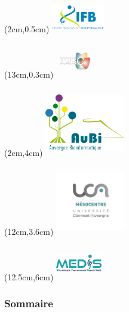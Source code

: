 
\begin{frame}
  \titlepage
  \begin{textblock*}{5cm}(2cm,0.5cm) %
  \includegraphics[width=2.3cm,height=1.3cm]{images/logo_ifb.pdf}
  \end{textblock*}
  \begin{textblock*}{5cm}(13cm,0.3cm) %
  \includegraphics[width=1.5cm,height=1.5cm]{images/i2bc.png}
  \end{textblock*}
  \begin{textblock*}{5cm}(2cm,4cm) %
  \includegraphics[width=3.5cm,height=3cm]{images/logoAuBi-2019.pdf}
  \end{textblock*}
  \begin{textblock*}{5cm}(12cm,3.6cm) %
  \includegraphics[width=3cm,height=3cm]{images/mesocentre.png}
  \end{textblock*}
   \begin{textblock*}{5cm}(12.5cm,6cm) %
  \includegraphics[width=2cm,height=1.5cm]{images/medis_logo.png}
  \end{textblock*}
\end{frame}
\begin{frame}
  \frametitle{Sommaire}
   \tableofcontents
\end{frame}
